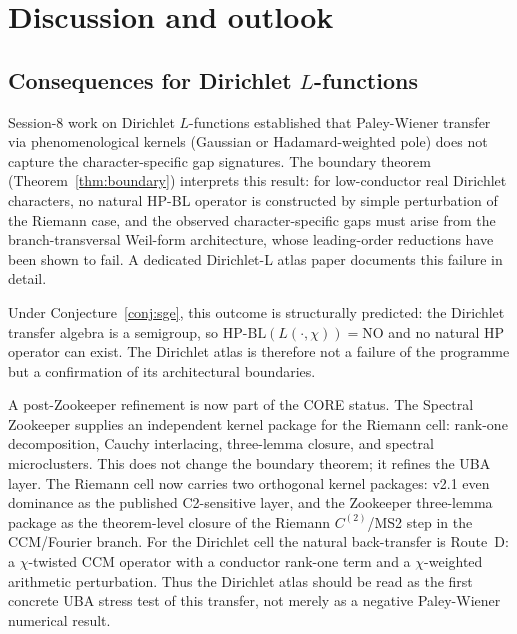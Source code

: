 \documentclass[11pt]{article}
\theoremstyle{definition}
\theoremstyle{remark}
\newcommand{\HBL}{\mathrm{HP\text{-}BL}}
\begin{document}
\section{Discussion and outlook}
\label{sec:outlook}

\subsection{Consequences for Dirichlet \texorpdfstring{$L$}{L}-functions}

Session-8 work on Dirichlet $L$-functions \cite{PaleyWienerDirichlet}
established that Paley-Wiener transfer via phenomenological kernels
(Gaussian or Hadamard-weighted pole) does not capture the
character-specific gap signatures. The boundary theorem
(Theorem~\ref{thm:boundary}) interprets this result: for low-conductor
real Dirichlet characters, no natural HP-BL operator is constructed
by simple perturbation of the Riemann case, and the observed
character-specific gaps must arise from the branch-transversal
Weil-form architecture, whose leading-order reductions have been
shown to fail. A dedicated Dirichlet-L atlas paper
\cite{DirichletAtlas} documents this failure in detail.

Under Conjecture~\ref{conj:sge}, this outcome is structurally
predicted: the Dirichlet transfer algebra is a semigroup, so
$\HBL(L(\cdot, \chi)) = \mathrm{NO}$ and no natural HP operator
can exist. The Dirichlet atlas is therefore not a failure of the
programme but a confirmation of its architectural boundaries.

A post-Zookeeper refinement is now part of the CORE status. The
Spectral Zookeeper \cite{Zookeeper2026} supplies an independent kernel
package for the Riemann cell: rank-one decomposition, Cauchy
interlacing, three-lemma closure, and spectral microclusters. This
does not change the boundary theorem; it refines the UBA layer. The
Riemann cell now carries two orthogonal kernel packages: v2.1 even
dominance as the published C2-sensitive layer, and the Zookeeper
three-lemma package as the theorem-level closure of the Riemann
$C^{(2)}$/MS2 step in the CCM/Fourier branch. For the Dirichlet cell
the natural back-transfer is Route~D:
a $\chi$-twisted CCM operator with a conductor rank-one term and a
$\chi$-weighted arithmetic perturbation. Thus the Dirichlet atlas
should be read as the first concrete UBA stress test of this transfer,
not merely as a negative Paley-Wiener numerical result.
\end{document}
